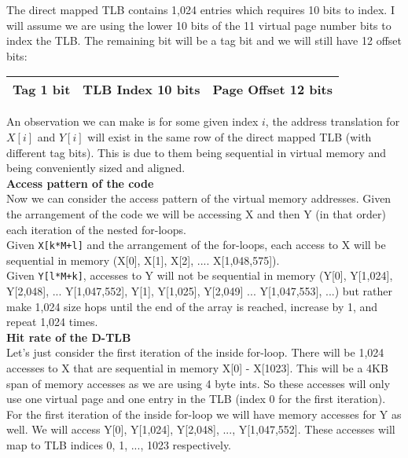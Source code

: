 \documentclass[a4paper, 11pt]{exam}
\begin{document}
\begin{enumerate}
The direct mapped TLB contains 1,024 entries which requires 10 bits to index. I will assume we are using the lower 10 bits of the 11 virtual page number bits to index the TLB. The remaining bit will be a tag bit and we will still have 12 offset bits:

\begin{center}
	\begin{tabular}{|c|c|c|}
		\hline
		Tag 1 bit & TLB Index 10 bits & Page Offset 12 bits\\
		\hline
	\end{tabular}
\end{center}

An observation we can make is for some given index $i$, the address translation for $X[i]$ and $Y[i]$ will exist in the same row of the direct mapped TLB (with different tag bits). This is due to them being sequential in virtual memory and being conveniently sized and aligned. \\

\textbf{Access pattern of the code} \\

Now we can consider the access pattern of the virtual memory addresses. Given the arrangement of the code we will be accessing X and then Y (in that order) each iteration of the nested for-loops. \\

Given \texttt{X[k*M+l]} and the arrangement of the for-loops, each access to X will be sequential in memory (X[0], X[1], X[2], .... X[1,048,575]). \\

Given \texttt{Y[l*M+k]}, accesses to Y will not be sequential in memory (Y[0], Y[1,024], Y[2,048], ... Y[1,047,552], Y[1], Y[1,025], Y[2,049] ... Y[1,047,553], ...) but rather make 1,024 size hops until the end of the array is reached, increase by 1, and repeat 1,024 times. \\

\textbf{Hit rate of the D-TLB} \\

Let's just consider the first iteration of the inside for-loop. There will be 1,024 accesses to X that are sequential in memory X[0] - X[1023]. This will be a 4KB span of memory accesses as we are using 4 byte ints. So these accesses will only use one virtual page and one entry in the TLB (index 0 for the first iteration). \\

For the first iteration of the inside for-loop we will have memory accesses for Y as well. We will access Y[0], Y[1,024], Y[2,048], ..., Y[1,047,552]. These accesses will map to TLB indices 0, 1, ..., 1023 respectively.\\


\end{enumerate}
\end{document}
